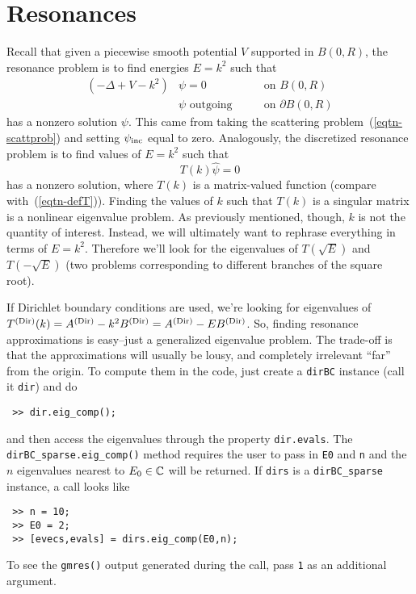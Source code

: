 \section{Resonances}
\label{sec-resonances}

Recall that given a piecewise smooth potential $V$ supported
in $B(0,R)$, the resonance problem is to find energies
$E = k^2$ such that
\begin{equation}
\begin{aligned}
 \left(-\Delta + V - k^2\right)&\psi = 0 &\qquad\text{on } B(0,R) \\ 
 &\psi \text{ outgoing} &\qquad\text{on } \partial B(0,R)
\end{aligned}
\end{equation}
has a nonzero solution $\psi$. This came from taking the scattering
problem~(\ref{eqtn-scattprob}) and setting $\psi_{\text{inc}}$ equal to zero.
Analogously, the discretized resonance problem is to find values of
$E = k^2$ such that
\begin{equation}
 T(k)\widehat{\psi} = 0
\end{equation}
has a nonzero solution, where $T(k)$ is a matrix-valued
function
(compare with~(\ref{eqtn-defT})).
Finding the values of $k$ such that $T(k)$ is a singular matrix is a
nonlinear eigenvalue problem. As previously mentioned, though, $k$ 
is not the quantity of interest. Instead, we will ultimately want
to rephrase everything in terms of $E = k^2$. Therefore we'll look
for the eigenvalues of $T(\sqrt{E})$ and $T(-\sqrt{E})$ (two problems
corresponding to different branches of the square root).

If Dirichlet boundary conditions are used, we're looking for
eigenvalues of $T^{(\text{Dir})}(k) = A^{(\text{Dir})} - k^2 B^{(\text{Dir})} = A^{(\text{Dir})} - E B^{(\text{Dir})}$.
So,
finding resonance approximations is easy--just a generalized 
eigenvalue problem. The trade-off is that the approximations will
usually be lousy, and completely irrelevant ``far''
from the origin. To compute them in the code, just create
a {\tt dirBC} instance (call it {\tt dir}) and do
\begin{verbatim}
 >> dir.eig_comp();
\end{verbatim}
and then access the eigenvalues through the property {\tt dir.evals}.
The {\tt dirBC\_sparse.eig\_comp()} method requires the user to
pass in {\tt E0} and {\tt n} and the $n$ eigenvalues nearest to
$E_0 \in \mathbb{C}$ will be returned. If {\tt dirs} is a
{\tt dirBC\_sparse} instance, a call looks like
\begin{verbatim}
 >> n = 10;
 >> E0 = 2;
 >> [evecs,evals] = dirs.eig_comp(E0,n);
\end{verbatim}
To see the {\tt gmres()} output generated during the call, pass {\tt 1}
as an additional argument.

